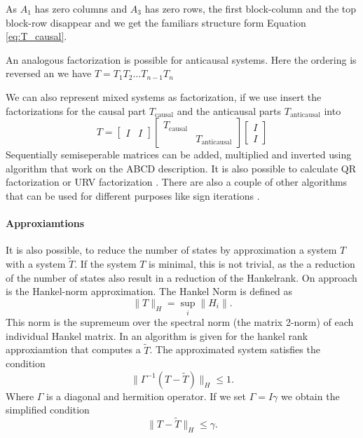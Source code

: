 \documentclass[doctype=mastersthesis,BCOR=15mm,biblatex]{ldvbook}%
\newcommand{\eye}{I} %
\begin{document}
As $A_1$ has zero columns and $A_3$ has zero rows, the first block-column and the top block-row disappear and we get the familiars structure form Equation\,\ref{eq:T_causal}.

An analogous factorization is possible for anticausal systems.
Here the ordering is reversed an we have $T = T_1 T_2 \dots T_{n-1} T_{n}$

We can also represent mixed systems as factorization, if we use insert the factorizations for the causal part $T_{\text{causal}}$ and the anticausal parts $T_{\text{anticausal}}$ into
\begin{equation}
	T = 
	\begin{bmatrix}
	\eye &
	\eye
	\end{bmatrix}
	\begin{bmatrix}
	T_{\text{causal}}&\\
	&T_{\text{anticausal}}
	\end{bmatrix}	
	\begin{bmatrix}
	\eye\\
	\eye
	\end{bmatrix}
\end{equation}
Sequentially semiseperable matrices can be added, multiplied and inverted using algorithm that work on the ABCD description.
It is also possible to calculate QR factorization \cite{chandrasekaran_fast_2002,tong_blind_2003} or URV factorization \cite{chandrasekaran_fast_2005}. 
There are also a couple of other algorithms that can be used for different purposes like sign iterations \cite{rice_efficient_2010}.

\paragraph{Approxiamtions}
It is also possible, to reduce the number of states by approximation a system $T$ with a system $\tilde{T}$.
If the system $T$ is minimal, this is not trivial, as the a reduction of the number of states also result in a reduction of the Hankelrank.
On approach is the Hankel-norm approximation.
The Hankel Norm is defined as
\begin{equation}
	\|T\|_H = \sup_{i}\|H_i\|.
\end{equation}
This norm is the supremeum over the spectral norm (the matrix 2-norm) of each individual Hankel matrix.
In \cite{dewilde_time-varying_1998} an algorithm is given for the hankel rank approxiamtion that computes a $\tilde{T}$.
The approximated system satisfies the condition
\begin{equation}
	\| \Gamma^{-1}(T-\tilde{T})\|_H \leq 1.
\end{equation}
Where $\Gamma$ is a diagonal and hermition operator. 
If we set $\Gamma = \eye\gamma$ we obtain the simplified condition
\begin{equation}
	\|T-\tilde{T}\|_H \leq \gamma.
\end{equation}
\end{document}
